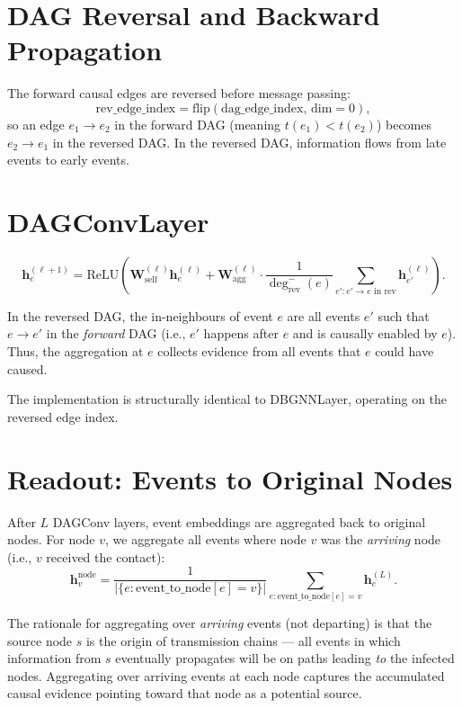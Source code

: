 \documentclass[12pt,a4paper]{report}
\newcommand{\bh}{\mathbf{h}}
\newcommand{\bW}{\mathbf{W}}
\begin{document}
\section{DAG Reversal and Backward Propagation}

The forward causal edges are reversed before message passing:
\begin{equation}
  \text{rev\_edge\_index} = \text{flip}(\text{dag\_edge\_index},\, \text{dim}=0),
\end{equation}
so an edge $e_1 \to e_2$ in the forward DAG (meaning $t(e_1) < t(e_2)$) becomes
$e_2 \to e_1$ in the reversed DAG. In the reversed DAG, information flows from
late events to early events.

\section{DAGConvLayer}

\begin{equation}
  \bh_e^{(\ell+1)} = \text{ReLU}\!\left(\bW_{\text{self}}^{(\ell)} \bh_e^{(\ell)} + \bW_{\text{agg}}^{(\ell)} \cdot \frac{1}{\deg^-_{\text{rev}}(e)} \sum_{e' : e' \to e \text{ in rev}} \bh_{e'}^{(\ell)}\right).
  \label{eq:dag_layer}
\end{equation}

In the reversed DAG, the in-neighbours of event $e$ are all events $e'$ such
that $e \to e'$ in the \emph{forward} DAG (i.e., $e'$ happens after $e$ and is
causally enabled by $e$). Thus, the aggregation at $e$ collects evidence from
all events that $e$ could have caused.

The implementation is structurally identical to DBGNNLayer, operating on the
reversed edge index.

\section{Readout: Events to Original Nodes}

After $L$ DAGConv layers, event embeddings are aggregated back to original
nodes. For node $v$, we aggregate all events where node $v$ was the
\emph{arriving} node (i.e., $v$ received the contact):
\begin{equation}
  \bh_v^{\text{node}} = \frac{1}{|\{e : \text{event\_to\_node}[e] = v\}|} \sum_{e : \text{event\_to\_node}[e] = v} \bh_e^{(L)}.
  \label{eq:dag_readout}
\end{equation}

The rationale for aggregating over \emph{arriving} events (not departing) is
that the source node $s$ is the origin of transmission chains — all events in
which information from $s$ eventually propagates will be on paths leading
\emph{to} the infected nodes. Aggregating over arriving events at each node
captures the accumulated causal evidence pointing toward that node as a
potential source.
\end{document}
